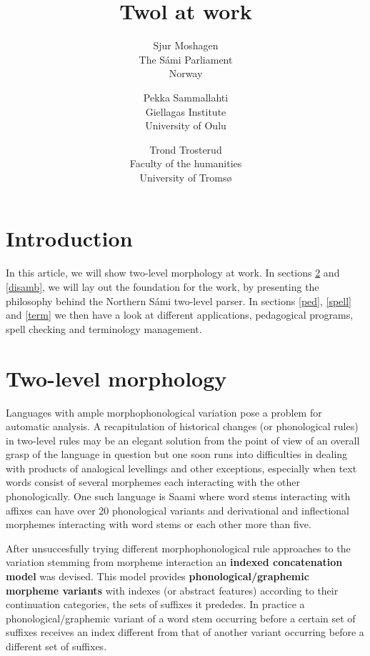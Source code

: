 \documentclass[a4paper,english]{article}
\begin{document}
\title{Twol at work}

\author{Sjur Moshagen\\ The Sámi Parliament\\ Norway
\and Pekka Sammallahti\\ Giellagas Institute\\ University of Oulu
\and Trond Trosterud\\ Faculty of the humanities\\ University of Tromsø}


\maketitle

\tableofcontents

\section{Introduction}

In this article, we will show two-level morphology at work. In sections \ref{twol} and \ref{disamb}, we will lay out the foundation for the work, by presenting the philosophy behind the Northern Sámi two-level parser. In sections \ref{ped}, \ref{spell} and \ref{term} we then have a look at different applications, pedagogical programs, spell checking and terminology management.

\section{Two-level morphology}\label{twol}

Languages with ample morphophonological variation pose a problem for automatic analysis. A recapitulation of historical changes (or phonological rules) in two-level rules may be an elegant solution from the point of view of an overall grasp of the language in question but one soon runs into difficulties in dealing with products of analogical levellings and other exceptions, especially when text words consist of several morphemes each interacting with the other phonologically. One such language is Saami where word stems interacting with affixes can have over 20 phonological variants and derivational and inflectional morphemes interacting with word stems or each other more than five. 

After unsuccesfully trying different morphophonological rule approaches to the variation stemming from morpheme interaction an \textbf{indexed concatenation model} was devised. This model provides \textbf{phonological/graphemic morpheme variants} with indexes (or abstract features) according to their continuation categories, the sets of suffixes it prededes. In practice a phonological/graphemic variant of a word stem occurring before a certain set of suffixes receives an index different from that of another variant occurring before a different set of suffixes. 
\end{document}
